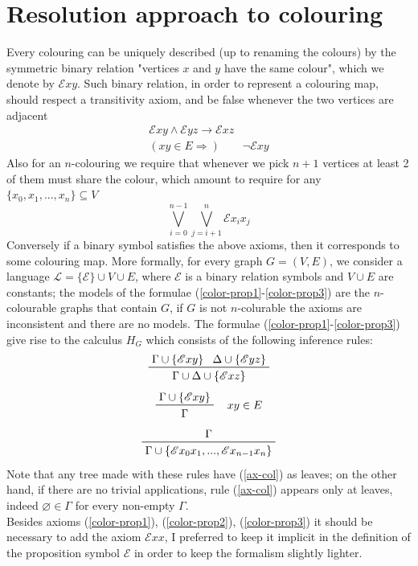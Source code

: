 \documentclass[a4paper,12pt,twoside]{book}
\newcommand{\E}{\mathscr{E}}
\let\emptyset\varnothing
\begin{document}
\section{Resolution approach to colouring}
Every colouring can be uniquely described (up to renaming the colours) by the symmetric binary relation "vertices $x$ and $y$ have the same colour", which we denote by  $\E xy$. 
Such binary relation, in order to represent a colouring map, should respect a transitivity axiom, and be false whenever the two vertices are adjacent 
\begin{gather}
\E xy \wedge \E yz \rightarrow  \E xz \label{color-prop1}\\
( xy \in E \Rightarrow ) \qquad  \neg \E xy \label{color-prop2}
\end{gather}
Also for an $n$-colouring we require that whenever we pick $n+1$ vertices at least 2 of them must share the colour, which amount to require for any $\{ x_0, x_1, ... , x_n \} \subseteq  V$
\begin{equation} \label{color-prop3}
\bigvee_{i=0}^{n-1} \bigvee_{j=i+1}^{n} \E x_i x_j
\end{equation}
Conversely if a binary symbol satisfies the above axioms, then it corresponds to some colouring map. More formally, for every graph $G=(V,E)$, we consider a language $\mathscr{L}=\{\E\}\cup V\cup E$, where $\E$ is a binary relation symbols and $V\cup E$ are constants; the models of the formulae (\ref{color-prop1}-\ref{color-prop3}) are the $n$-colourable graphs that contain $G$, if $G$ is not $n$-colurable the axioms are inconsistent and there are no models. The formulae (\ref{color-prop1}-\ref{color-prop3}) give rise to the calculus $H_G$ which consists of the following inference rules:
\begin{equation}
\label{trans}
 \prftree{\Gamma \cup \{\E xy \}}{\Delta \cup \{\E yz \}}{\Gamma \cup \Delta \cup \{\E xz \}}
\end{equation}
\begin{equation}
\label{jred}
\prftree[r]{$\quad xy \in E $}{\Gamma \cup \{\E xy \}}{ \Gamma}
\end{equation}
\begin{equation}
 \label{ax-col}
\prftree{\Gamma}{ \Gamma \cup \{\E x_0 x_1 , ... , \E x_{n-1} x_n  \}}
\end{equation}
Note that any tree made with these rules have (\ref{ax-col}) as leaves; on the other hand, if there are no trivial applications, rule (\ref{ax-col}) appears only at leaves, indeed $\emptyset\in\Gamma$ for every non-empty $\Gamma$.  \\
Besides axioms (\ref{color-prop1}), (\ref{color-prop2}), (\ref{color-prop3}) it should be necessary to add the axiom $\E xx$, I preferred to keep it implicit in the definition of the proposition symbol $\E$ in order to keep the formalism slightly lighter.
\end{document}
